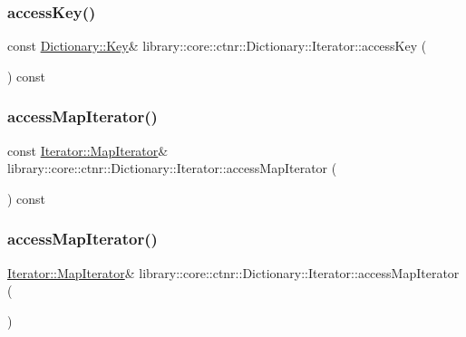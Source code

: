 \subsubsection{\texorpdfstring{access\+Key()}{accessKey()}}
{\footnotesize\ttfamily const \hyperlink{classlibrary_1_1core_1_1ctnr_1_1Dictionary_a987cae687cce70d81a2a483c5e05e842}{Dictionary\+::\+Key}\& library\+::core\+::ctnr\+::\+Dictionary\+::\+Iterator\+::access\+Key (\begin{DoxyParamCaption}{ }\end{DoxyParamCaption}) const}

\mbox{\label{classlibrary_1_1core_1_1ctnr_1_1Dictionary_1_1Iterator_a202f6a93a302e94078a33c1bcc999deb}} 
\subsubsection{\texorpdfstring{access\+Map\+Iterator()}{accessMapIterator()}\hspace{0.1cm}{\footnotesize\ttfamily [1/2]}}
{\footnotesize\ttfamily const \hyperlink{classlibrary_1_1core_1_1ctnr_1_1Dictionary_1_1Iterator_a990205e908ac1bafcd754993219b805e}{Iterator\+::\+Map\+Iterator}\& library\+::core\+::ctnr\+::\+Dictionary\+::\+Iterator\+::access\+Map\+Iterator (\begin{DoxyParamCaption}{ }\end{DoxyParamCaption}) const}

\mbox{\label{classlibrary_1_1core_1_1ctnr_1_1Dictionary_1_1Iterator_acbc6831522ba983453d99696b58e055c}} 
\subsubsection{\texorpdfstring{access\+Map\+Iterator()}{accessMapIterator()}\hspace{0.1cm}{\footnotesize\ttfamily [2/2]}}
{\footnotesize\ttfamily \hyperlink{classlibrary_1_1core_1_1ctnr_1_1Dictionary_1_1Iterator_a990205e908ac1bafcd754993219b805e}{Iterator\+::\+Map\+Iterator}\& library\+::core\+::ctnr\+::\+Dictionary\+::\+Iterator\+::access\+Map\+Iterator (\begin{DoxyParamCaption}{ }\end{DoxyParamCaption})}

